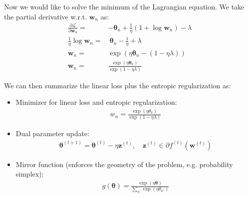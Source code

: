 \documentclass[11pt]{article}
\newcommand{\btheta}{\boldsymbol{\theta}}
\newcommand{\bz}{\boldsymbol{z}}
\newcommand{\bw}{\boldsymbol{w}}
\begin{document}
Now we would like to solve the minimum of the Lagrangian equation. We take the partial derivative w.r.t. $\bw_n$ as:
\begin{align}\label{eq:lag}
    \frac{\partial \mathcal{L}}{\partial \bw_n} = & -\btheta_n + \frac{1}{\eta} (1 + \log \bw_n) - \lambda \nonumber \\
    \frac{1}{\eta} \log \bw_n= & ~ \btheta_n - \frac{1}{\eta} + \lambda\nonumber\\
    \bw_n = & \exp (\eta \btheta_n - (1 - \eta \lambda\nonumber))\\
    \bw_n = & \frac{\exp (\eta \btheta_k)}{\exp (1-\eta \lambda)} \nonumber
\end{align}

We can then summarize the linear loss plus the entropic regularization as:
\begin{itemize}
    \item Minimizer for linear loss and entropic regularization:
    \begin{equation*}
    \begin{split}
    w_n = \frac{\exp(\eta\theta_k)}{\exp(1-\eta\lambda)}
    \end{split}
    \end{equation*}
    \item Dual parameter update:
    \begin{equation*}
    \begin{split}
    \btheta^{(t+1)} = \btheta^{(t)} - \eta\bz^{(t)}, \quad \bz^{(t)} \in \partial f^{(t)}(\bw^{(t)})
    \end{split}
    \end{equation*}
    \item Mirror function (enforces the geometry of the problem, e.g. probability simplex):
    \begin{equation*}
    \begin{split}
    g(\btheta) = \frac{\exp(\eta\btheta)}{\sum_{n'}\exp(\eta\theta_{n'})}
    \end{split}
    \end{equation*}
\end{itemize}

\end{document}
